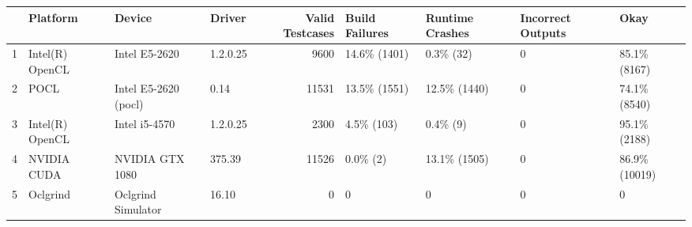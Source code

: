 \begin{tabular}{llllrllll}
\toprule
{} &         Platform &                Device &    Driver &  Valid Testcases & Build Failures & Runtime Crashes & Incorrect Outputs &           Okay \\
\midrule
1 &  Intel(R) OpenCL &         Intel E5-2620 &  1.2.0.25 &             9600 &   14.6\% (1401) &       0.3\% (32) &                 0 &   85.1\% (8167) \\
2 &             POCL &  Intel E5-2620 (pocl) &      0.14 &            11531 &   13.5\% (1551) &    12.5\% (1440) &                 0 &   74.1\% (8540) \\
3 &  Intel(R) OpenCL &         Intel i5-4570 &  1.2.0.25 &             2300 &     4.5\% (103) &        0.4\% (9) &                 0 &   95.1\% (2188) \\
4 &      NVIDIA CUDA &       NVIDIA GTX 1080 &    375.39 &            11526 &       0.0\% (2) &    13.1\% (1505) &                 0 &  86.9\% (10019) \\
5 &         Oclgrind &    Oclgrind Simulator &     16.10 &                0 &              0 &               0 &                 0 &              0 \\
\bottomrule
\end{tabular}
